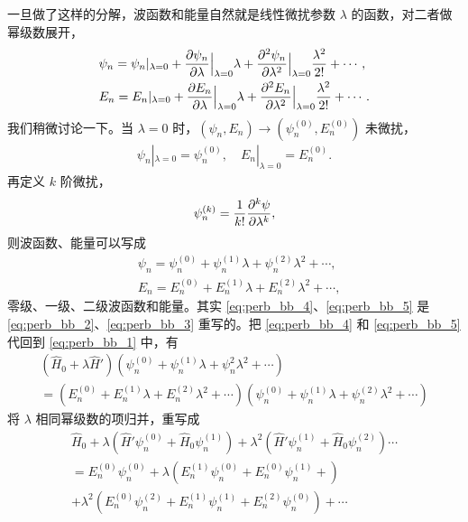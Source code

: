 一旦做了这样的分解，波函数和能量自然就是线性微扰参数 $\lambda$ 的函数，对二者做幂级数展开，
\begin{align}
    &\psi_n = \psi_n |_{\lambda = 0} + \pdv{\psi_n}{\lambda}\Big|_{\lambda = 0}\lambda + \pdv[2]{\psi_n}{\lambda}\Big|_{\lambda = 0} \frac{\lambda^2}{2!} + \cdots, 
    \label{eq:perb_bb_2} %
    \\
    &E_n = E_n |_{\lambda = 0} + \pdv{E_n}{\lambda}\Big|_{\lambda = 0}\lambda + \pdv[2]{E_n}{\lambda}\Big|_{\lambda = 0} \frac{\lambda^2}{2!} + \cdots. 
    \label{eq:perb_bb_3}
\end{align}
我们稍微讨论一下。当 $\lambda = 0$ 时，$(\psi_n, E_n) \rightarrow (\psi_n^{(0)}, E_n^{(0)})$ 未微扰，
\begin{align}
    \psi_n |_{\lambda=0} = \psi_n^{(0)}, \quad E_n|_{\lambda=0} = E_n^{(0)}. 
\end{align}
再定义 $k$ 阶微扰，
\begin{align}
    \psi_n^{(k)} = \frac1{k!} \pdv[k]{\psi}{\lambda},
\end{align}
则波函数、能量可以写成
\begin{align}
    &\psi_n = \psi_n^{(0)} + \psi_n^{(1)}\lambda + \psi_n^{(2)} \lambda^2 + \cdots, \label{eq:perb_bb_4}\\
    &E_n = E_n^{(0)} + E_n^{(1)} \lambda + E_n^{(2)}\lambda^2 + \cdots, \label{eq:perb_bb_5}
\end{align}
零级、一级、二级波函数和能量。其实 \eqref{eq:perb_bb_4}、\eqref{eq:perb_bb_5} 是 \eqref{eq:perb_bb_2}、\eqref{eq:perb_bb_3} 重写的。把 \eqref{eq:perb_bb_4} 和 \eqref{eq:perb_bb_5} 代回到 \eqref{eq:perb_bb_1} 中，有
\begin{multline}
    (\hat H_0 + \lambda \hat H') \left(
        \psi_n^{(0)} + \psi_n^{(1)}\lambda + \psi_n^{2} \lambda^2 + \cdots
    \right) \\= 
    \left(
        E_n^{(0)} + E_n^{(1)} \lambda + E_n^{(2)}\lambda^2 + \cdots
    \right)
    \left(
        \psi_n^{(0)} + \psi_n^{(1)}\lambda + \psi_n^{(2)} \lambda^2 + \cdots
    \right)
\end{multline}
将 $\lambda$ 相同幂级数的项归并，重写成
\begin{multline}
    \hat H_0 + \lambda \left(
        \hat H' \psi_n^{(0)} + \hat H_0 \psi_n^{(1)}
    \right) + \lambda^2 \left(
        \hat H' \psi_n^{(1)} + \hat H_0 \psi_n^{(2)}
    \right) \cdots \\ = 
    E_n^{(0)} \psi_n^{(0)} + \lambda \left(
        E_n^{(1)} \psi_n^{(0)} + E_n^{(0)} \psi_n^{(1)} + 
    \right) 
    \\+ \lambda^2 \left(
        E_n^{(0)} \psi_n^{(2)} +E_n^{(1)} \psi_n^{(1)} + E_n^{(2)} \psi_n^{(0)}
    \right) + \cdots
\end{multline}
